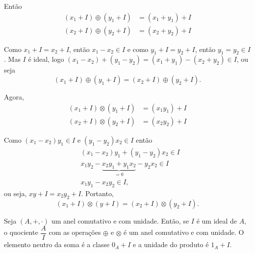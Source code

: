 Ent{\~a}o
\begin{align*}
	(x_1 + I) \oplus (y_1 + I) &= (x_1 + y_1) + I\\
	(x_2 + I) \oplus (y_2 + I) &= (x_2 + y_2) + I
\end{align*}

Como $x_1 + I = x_2 + I$, ent{\~a}o $x_1 - x_2 \in I$ e como $y_1 + I = y_2 + I$, ent{\~a}o $y_1 = y_2 \in I$. Mas $I$ {\'e} ideal, logo $(x_1 - x_2) + (y_1 - y_2) = (x_1 + y_1) - (x_2 + y_2) \in I$, ou seja
\[
	(x_1 + I) \oplus (y_1 + I) = (x_2 + I) \oplus (y_2 + I).
\]

Agora,
\begin{align*}
	(x_1 + I) \otimes (y_1 + I) &= (x_1y_1) + I\\
	(x_2 + I) \otimes (y_2 + I) &= (x_2y_2) + I
\end{align*}

Como $(x_1 - x_2)y_1 \in I$ e $(y_1 - y_2)x_2 \in I$ ent\~ao
\begin{align*}
	&(x_1 - x_2)y_1 + (y_1 - y_2)x_2 \in I\\
	&x_1y_2-\underbrace{x_2y_1 + y_1x_2}_{= 0} - y_2x_2 \in I\\
	&x_1y_1 - x_2y_2\in I,
\end{align*}
ou seja, $xy + I = x_2y_2 + I$. Portanto,
\[
	(x_1 + I) \otimes (y + I) = (x_2 + I) \otimes (y_2 + I).
\]

\begin{teorema}
	Seja $(A, +, \cdot)$ um anel comutativo e com unidade. Ent{\~a}o, se $I$ {\'e} um ideal de $A$,
	o quociente $\dfrac{A}{I}$ com as opera{\c c}{\~o}es $\oplus$ e $\otimes$ {\'e} um anel comutativo e com unidade. O elemento neutro da soma {\'e} a classe $0_{A} + I$ e a unidade do produto {\'e} $1_{A} + I$.
\end{teorema}
